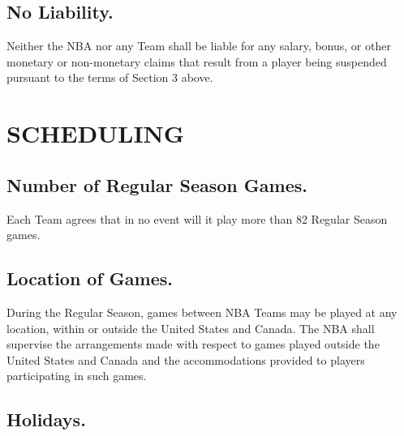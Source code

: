 \documentclass[
]{book}
\begin{document}
\hypertarget{no-liability.}{%
\section{No Liability.}\label{no-liability.}}

Neither the NBA nor any Team shall be liable for any salary, bonus, or other monetary or non-monetary claims that result from a player being suspended pursuant to the terms of Section 3 above.

\hypertarget{scheduling}{%
\chapter{SCHEDULING}\label{scheduling}}

\hypertarget{number-of-regular-season-games.}{%
\section{Number of Regular Season Games.}\label{number-of-regular-season-games.}}

Each Team agrees that in no event will it play more than 82 Regular Season games.

\hypertarget{location-of-games.}{%
\section{Location of Games.}\label{location-of-games.}}

During the Regular Season, games between NBA Teams may be played at any location, within or outside the United States and Canada. The NBA shall supervise the arrangements made with respect to games played outside the United States and Canada and the accommodations provided to players participating in such games.

\hypertarget{holidays.}{%
\section{Holidays.}\label{holidays.}}
\end{document}
